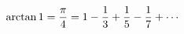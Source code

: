 \documentclass[preview]{standalone}
\begin{document}
\begin{align*}
\special{dvisvgm:raw <g id='unique000'>}\arctan 1=\dfrac{\pi}{4}=1-\dfrac{1}{3}+\dfrac{1}{5}-\dfrac{1}{7}+\cdots\special{dvisvgm:raw </g>}
\end{align*}
\end{document}
